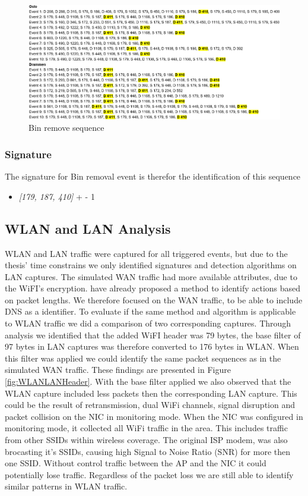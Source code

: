 \begin{figure}[H]
    \centering
    \includegraphics[width=\textwidth]{figures/Sequence_BR.png}
    \caption{Bin remove sequence}
    \label{fig:BRseq}
\end{figure}

\subsubsection{Signature}
The signature for Bin removal event is therefor the identification of this sequence
\begin{itemize}
    \item \textit{[179, 187, 410]} + - 1
\end{itemize}


\subsection{WLAN and LAN Analysis}
WLAN and LAN traffic were captured for all triggered events, but due to the thesis' time constrains we only identified signatures and detection algorithms on LAN captures. The simulated WAN traffic had more available attributes, due to the WiFI's encryption. \cite{pingpong_trimananda2020packet} have already proposed a method to identify actions based on packet lengths. We therefore focused on the WAN traffic, to be able to include DNS as a identifier. To evaluate if the same method and algorithm is applicable  to WLAN traffic we did a comparison of two corresponding captures. Through analysis we identified that the added WiFI header was 79 bytes, the base filter of 97 bytes in LAN captures was therefore converted to 176 bytes in WLAN. When this filter was applied we could identify the same packet sequences as in the simulated WAN traffic. These findings are presented in Figure \ref{fig:WLANLANHeader}. With the base filter applied we also observed that the WLAN capture included less packets then the corresponding LAN capture. This could be the result of retransmission, dual WiFi channels, signal disruption and packet collision on the NIC in monitoring mode. When the NIC was configured in monitoring mode, it collected all WiFi traffic in the area. This includes traffic from other SSIDs within wireless coverage. The original ISP modem, was also brocasting it's SSIDs, causing high Signal to Noise Ratio (SNR) for more then one SSID. Without control traffic between the AP and the NIC it could potentially lose traffic. Regardless of the packet loss we are still able to identify similar patterns in WLAN traffic. 

